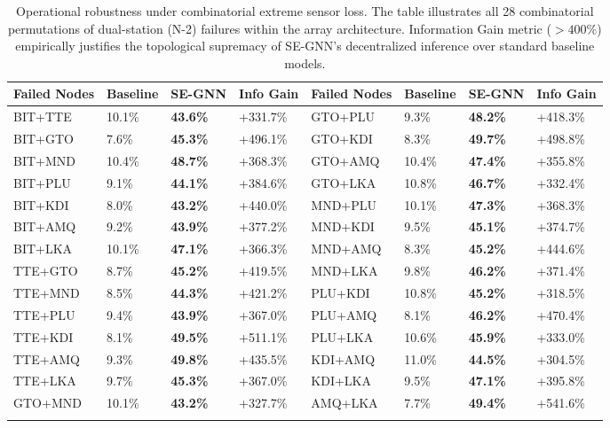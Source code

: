 \documentclass[pdflatex,sn-mathphys-num]{sn-jnl}
\begin{document}
\begin{table}[!ht]
\caption{Operational robustness under combinatorial extreme sensor loss. The table illustrates all 28 combinatorial permutations of dual-station (N-2) failures within the array architecture. Information Gain metric ($>400\%$) empirically justifies the topological supremacy of SE-GNN's decentralized inference over standard baseline models.}\label{tab2}
{\footnotesize\setlength{\tabcolsep}{4pt}
\begin{tabular}{@{}llll|llll@{}}
\toprule
Failed Nodes & Baseline & \textbf{SE-GNN} & \textbf{Info Gain} & Failed Nodes & Baseline & \textbf{SE-GNN} & \textbf{Info Gain} \\
\midrule
BIT+TTE & 10.1\% & \textbf{43.6\%} & +331.7\% & GTO+PLU & 9.3\% & \textbf{48.2\%} & +418.3\% \\
BIT+GTO & 7.6\% & \textbf{45.3\%} & +496.1\% & GTO+KDI & 8.3\% & \textbf{49.7\%} & +498.8\% \\
BIT+MND & 10.4\% & \textbf{48.7\%} & +368.3\% & GTO+AMQ & 10.4\% & \textbf{47.4\%} & +355.8\% \\
BIT+PLU & 9.1\% & \textbf{44.1\%} & +384.6\% & GTO+LKA & 10.8\% & \textbf{46.7\%} & +332.4\% \\
BIT+KDI & 8.0\% & \textbf{43.2\%} & +440.0\% & MND+PLU & 10.1\% & \textbf{47.3\%} & +368.3\% \\
BIT+AMQ & 9.2\% & \textbf{43.9\%} & +377.2\% & MND+KDI & 9.5\% & \textbf{45.1\%} & +374.7\% \\
BIT+LKA & 10.1\% & \textbf{47.1\%} & +366.3\% & MND+AMQ & 8.3\% & \textbf{45.2\%} & +444.6\% \\
TTE+GTO & 8.7\% & \textbf{45.2\%} & +419.5\% & MND+LKA & 9.8\% & \textbf{46.2\%} & +371.4\% \\
TTE+MND & 8.5\% & \textbf{44.3\%} & +421.2\% & PLU+KDI & 10.8\% & \textbf{45.2\%} & +318.5\% \\
TTE+PLU & 9.4\% & \textbf{43.9\%} & +367.0\% & PLU+AMQ & 8.1\% & \textbf{46.2\%} & +470.4\% \\
TTE+KDI & 8.1\% & \textbf{49.5\%} & +511.1\% & PLU+LKA & 10.6\% & \textbf{45.9\%} & +333.0\% \\
TTE+AMQ & 9.3\% & \textbf{49.8\%} & +435.5\% & KDI+AMQ & 11.0\% & \textbf{44.5\%} & +304.5\% \\
TTE+LKA & 9.7\% & \textbf{45.3\%} & +367.0\% & KDI+LKA & 9.5\% & \textbf{47.1\%} & +395.8\% \\
GTO+MND & 10.1\% & \textbf{43.2\%} & +327.7\% & AMQ+LKA & 7.7\% & \textbf{49.4\%} & +541.6\% \\
\botrule
\end{tabular}}
\end{table}
\end{document}

